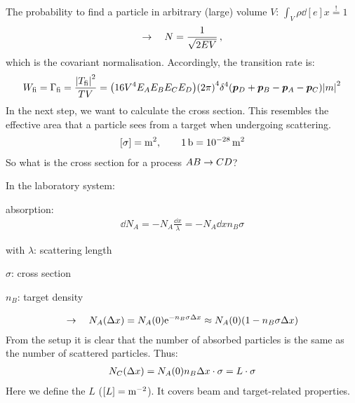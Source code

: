 The probability to find a particle in arbitrary (large) volume $V$: $\int_V \rho \dd[e]{x} \overset{!}{=} 1$
\begin{align}
    \rightarrow \quad N = \frac{1}{\sqrt{2EV}}\,,
\end{align}
which is the covariant normalisation. Accordingly, the transition rate is:
\begin{align}
    W_{\mathrm{fi}} = \Gamma_{\mathrm{fi}} = \frac{\qty| T_{\mathrm{fi}}|^2}{TV} = \qty(16 V^4 E_A E_B E_C E_D) \qty(2\pi)^4 \delta^4 \qty({\bm{p}}_D + {\bm{p}}_B - {\bm{p}}_A - {\bm{p}}_C) \qty|m|^2
\end{align}
In the next step, we want to calculate the cross section. This resembles the effective area that a particle sees from a target when undergoing scattering.
\begin{align}
    \qty[\sigma] = \si{\square\meter}, \qquad \SI{1}{\barn} = \SI{e-28}{\square\meter}
\end{align}
So what is the cross section for a process $AB \rightarrow CD$?

In the laboratory system:
\begin{center}
\end{center}
absorption:
\begin{align}
    \dd{N_A} = - N_A \frac{\dd{x}}{\lambda} = -N_A \dd{x} n_B \sigma
\end{align}
\begin{compactitem}
    \item[with] $\lambda$: scattering length
    \item[] $\sigma$: cross section
    \item[] $n_B$: target density
\end{compactitem}
\begin{align}
    \rightarrow \quad N_A \qty(\Delta x) = N_A \qty(0) \mathrm{e}^{-n_B \sigma \Delta x} \approx N_A\qty(0) \qty(1-n_B \sigma \Delta x)
\end{align}
From the setup it is clear that the number of absorbed particles is the same as the number of scattered particles. Thus:
\begin{align}
    N_C \qty(\Delta x) = N_A\qty(0) n_B \Delta x \cdot \sigma = L \cdot \sigma 
\end{align}
Here we define the  $L$ ($\qty[L] = \si{\per\square\meter}$). It covers beam and target-related properties.

